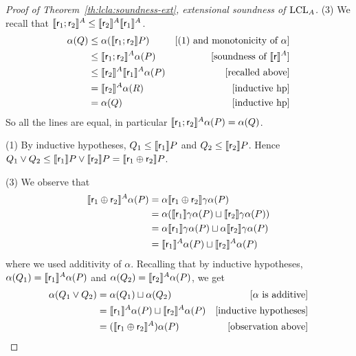 \begin{proof}[Proof of Theorem~\ref{th:lcla:soundness-ext}, extensional soundness of $\text{LCL}_A$]
	\noindent (3) We recall that $\llbracket\mathsf{r}_1; \mathsf{r}_2\rrbracket^{A} \le \llbracket\mathsf{r}_2\rrbracket^{A} \llbracket\mathsf{r}_1\rrbracket^{A}$.
	\begin{align*}
		\alpha(Q) & \le \alpha(\llbracket\mathsf{r}_1; \mathsf{r}_2\rrbracket P)                & [\text{(1) and monotonicity of }\alpha] \\
		          & \le \llbracket\mathsf{r}_1; \mathsf{r}_2\rrbracket^{A} \alpha(P)            & [\text{soundness of }\llbracket\mathsf{r}\rrbracket^{A}] \\
		          & \le \llbracket\mathsf{r}_2\rrbracket^{A} \llbracket\mathsf{r}_1\rrbracket^{A} \alpha(P) & [\text{recalled above}]                 \\
		          & = \llbracket\mathsf{r}_2\rrbracket^{A} \alpha(R)                       & [\text{inductive hp}]                   \\
		          & = \alpha(Q)                                           & [\text{inductive hp}]
	\end{align*}
	So all the lines are equal, in particular $\llbracket\mathsf{r}_1; \mathsf{r}_2\rrbracket^{A} \alpha(P) = \alpha(Q)$.

	\noindent (1) By inductive hypotheses, $Q_1 \le \llbracket\mathsf{r}_1\rrbracket P$ and $Q_2 \le \llbracket\mathsf{r}_2\rrbracket P$. Hence $Q_1 \lor Q_2 \le \llbracket\mathsf{r}_1\rrbracket P \lor \llbracket\mathsf{r}_2\rrbracket P = \llbracket\mathsf{r}_1 \oplus \mathsf{r}_2\rrbracket P$.

	\noindent (3) We observe that
	\begin{align*}
		\llbracket\mathsf{r}_1 \oplus \mathsf{r}_2\rrbracket^{A} \alpha(P) & = \alpha \llbracket\mathsf{r}_1 \oplus \mathsf{r}_2\rrbracket \gamma \alpha(P)                                   \\
		                                             & = \alpha (\llbracket\mathsf{r}_1\rrbracket \gamma \alpha (P) \sqcup \llbracket\mathsf{r}_2\rrbracket \gamma \alpha (P))      \\
		                                             & = \alpha \llbracket\mathsf{r}_1\rrbracket \gamma \alpha (P) \sqcup \alpha \llbracket\mathsf{r}_2\rrbracket \gamma \alpha (P) \\
		                                             & = \llbracket\mathsf{r}_1\rrbracket^{A}\alpha (P) \sqcup \llbracket\mathsf{r}_2\rrbracket^{A} \alpha (P)
	\end{align*}
	where we used additivity of $\alpha$.
	Recalling that by inductive hypotheses, $\alpha(Q_1) = \llbracket\mathsf{r}_1\rrbracket^{A} \alpha(P)$ and $\alpha(Q_2) = \llbracket\mathsf{r}_2\rrbracket^{A} \alpha(P)$, we get
	\begin{align*}
		\alpha(Q_1 \lor Q_2) & = \alpha(Q_1) \sqcup \alpha(Q_2)                                     & [\alpha\text{ is additive}]   \\
		                     & = \llbracket\mathsf{r}_1\rrbracket^{A} \alpha(P) \sqcup \llbracket\mathsf{r}_2\rrbracket^{A} \alpha(P) & [\text{inductive hypotheses}] \\
		                     & = (\llbracket\mathsf{r}_1 \oplus \mathsf{r}_2\rrbracket^{A}) \alpha(P)                     & [\text{observation above}]
	\end{align*}


\end{proof}
